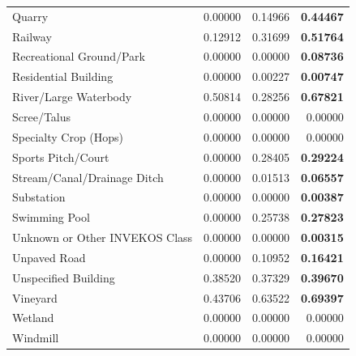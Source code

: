 \documentclass{report}
\begin{document}
\begin{table}[H]
\begin{tabular}{lrrr}
Quarry & 0.00000 & 0.14966 & \textbf{0.44467} \\
Railway & 0.12912 & 0.31699 & \textbf{0.51764} \\
Recreational Ground/Park & 0.00000 & 0.00000 & \textbf{0.08736} \\
Residential Building & 0.00000 & 0.00227 & \textbf{0.00747} \\
River/Large Waterbody & 0.50814 & 0.28256 & \textbf{0.67821} \\
Scree/Talus & 0.00000 & 0.00000 & 0.00000 \\
Specialty Crop (Hops) & 0.00000 & 0.00000 & 0.00000 \\
Sports Pitch/Court & 0.00000 & 0.28405 & \textbf{0.29224} \\
Stream/Canal/Drainage Ditch & 0.00000 & 0.01513 & \textbf{0.06557} \\
Substation & 0.00000 & 0.00000 & \textbf{0.00387} \\
Swimming Pool & 0.00000 & 0.25738 & \textbf{0.27823} \\
Unknown or Other INVEKOS Class & 0.00000 & 0.00000 & \textbf{0.00315} \\
Unpaved Road & 0.00000 & 0.10952 & \textbf{0.16421} \\
Unspecified Building & 0.38520 & 0.37329 & \textbf{0.39670} \\
Vineyard & 0.43706 & 0.63522 & \textbf{0.69397} \\
Wetland & 0.00000 & 0.00000 & 0.00000 \\
Windmill & 0.00000 & 0.00000 & 0.00000 \\
\bottomrule
\end{tabular}
\end{table}
\newpage
\end{document}
